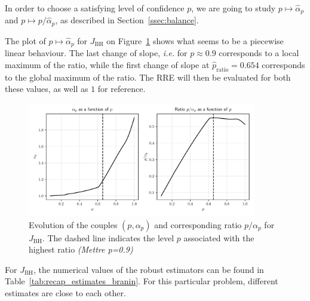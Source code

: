 \documentclass[preprint, 1p]{elsarticle}
\newcommand{\Ex}{\mathbb{E}}
\newcommand{\hatkmean}{\hat{\mathbf{k}}_{\Ex}}
\newcommand{\hatkvar}{\hat{\mathbf{k}}_{\mathbb{V}}}
\newcommand{\RRE}{RRE}
\newcommand{\checkap}{{\alpha}_p}
\newcommand{\checka}{{\alpha}}
\newcommand{\checkk}{\mathbf{k}}
\newcommand{\victor}[1]{{\itshape\color{green} ({#1})}}
\begin{document}

In order to choose a satisfying level of confidence $p$, we are going to study $p\mapsto \hat{\checka}_p$ and $p\mapsto p/\hat{\checka}_p$, as described in Section~\ref{ssec:balance}.

 The plot of $p\mapsto \hat{\checka}_p$ for $J_{\mathrm{BH}}$ on Figure~\ref{fig:ratio_BH} shows what seems to be a piecewise linear behaviour. The last change of slope, \textit{i.e.} for $p\approx 0.9$ corresponds to a local maximum of the ratio, while the first change of slope at $\hat{p}_{\mathrm{ratio}}=0.654$ corresponds to the global maximum of the ratio. The \RRE{} will then be evaluated for both these values, as well as $1$ for reference.
 
 \begin{figure}[!ht]
   \centering
\includegraphics[width=10cm]{Figures/alpha_p_BH.pdf}
\caption{Evolution of the couples $(p,\checkap)$ and corresponding ratio $p/\checkap$ for $J_{\mathrm{BH}}$. The dashed line indicates the level $p$ associated with the highest ratio \victor{Mettre p=0.9}}
\label{fig:ratio_BH}
\end{figure}


 For $J_{\mathrm{BH}}$, the numerical values of the robust estimators can be found in Table~\ref{tab:recap_estimates_branin}. For this particular problem, different estimates are close to each other.
 
\end{document}
